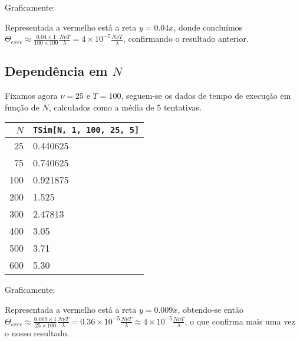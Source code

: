 \documentclass{article}
\begin{document}
	Graficamente:
	

	Representada a vermelho está a reta $y = 0.04x$, donde concluímos $\Theta_{exec} \approx \frac{0.04 \times 1}{100 \times 100} \frac{N \nu T}\lambda = 4 \times 10^{-5} \frac{N \nu T}\lambda$, confirmando o resultado anterior.
	
	\subsection{Dependência em $N$}
	
	Fixamos agora $\nu = 25$ e $T = 100$, seguem-se os dados de tempo de execução em função de $N$, calculados como a média de 5 tentativas.
	
	\begin{tabular}{r | l}
	$N$ & \texttt{TSim[N, 1, 100, 25, 5]} \\
	\hline
	25 & 0.440625 \\
	75 & 0.740625 \\
	100 & 0.921875 \\
	200 & 1.525 \\
	300 & 2.47813 \\
	400 & 3.05 \\
	500 & 3.71 \\
	600 & 5.30
	\end{tabular}
	
	Graficamente:
	

	Representada a vermelho está a reta $y = 0.009x$, obtendo-se então $\Theta_{exec} \approx \frac{0.009 \times 1}{25 \times 100} \frac{N \nu T}\lambda = 0.36  \times 10^{-5} \frac{N \nu T}\lambda \approx 4 \times 10^{-5} \frac{N \nu T}\lambda$, o que confirma mais uma vez o nosso resultado.
	
\end{document}
